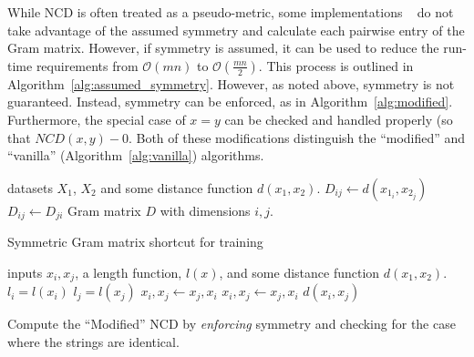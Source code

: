 \documentclass[conference]{IEEEtran}
\begin{document}
While NCD is often treated as a pseudo-metric, some implementations ~\cite{jiang2022less} do not take advantage of the assumed symmetry and calculate each pairwise entry of the Gram matrix. 
However, if symmetry is assumed, it can be used to reduce the run-time requirements from $\mathcal{O}(mn)$ to $\mathcal{O}(\frac{mn}{2})$.
This process is outlined in Algorithm~\ref{alg:assumed_symmetry}.
However, as noted above, symmetry is not guaranteed. 
Instead, symmetry can be enforced, as in Algorithm~\ref{alg:modified}. 
Furthermore, the special case of $x=y$ can be checked and handled properly (so that $NCD(x,y) - 0$.
Both of these modifications distinguish the ``modified'' and ``vanilla'' (Algorithm~\ref{alg:vanilla}) algorithms.
\begin{algorithm}
    \begin{algorithmic}
        \Require datasets $X_1$, $X_2$ and some distance function $d(x_1,x_2)$.
             
                \State $D_{ij} \gets d(x_{1_i},x_{2_j})$
                \State $D_{ij} \gets D_{ji}$ 
            \EndFor
        \EndFor
        \State \Return Gram matrix $D$ with dimensions $i,j$.
    \end{algorithmic}
    \caption{Symmetric Gram matrix shortcut for training}
    \label{alg:symmetric}
\end{algorithm}


\begin{algorithm}
    \begin{algorithmic}
        \Require inputs $x_i, x_j$, a length function, $l(x)$, and some distance function $d(x_1,x_2)$.
         
            \State {}
        \Else  {}
            \State $l_i = l(x_i)$
            \State $l_j = l(x_j)$
                 \State $x_i, x_j \gets x_j, x_i$ 
                 
                     \State $x_i, x_j \gets x_j, x_i$ 
                \EndIf
            \EndIf
            \State \Return $d(x_i, x_j)$
        \EndIf
    \end{algorithmic}
    \caption{Compute the ``Modified'' NCD by \textit{enforcing} symmetry and checking for the case where the strings are identical.}
    \label{alg:modified}
\end{algorithm}
\end{document}
